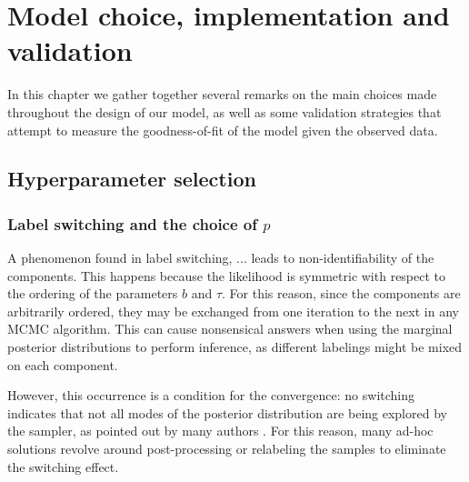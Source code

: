 %
%

\chapter{Model choice, implementation and validation}\label{ch:model-choice}

In this chapter we gather together several remarks on the main choices made throughout the design of our model, as well as some validation strategies that attempt to measure the goodness-of-fit of the model given the observed data.

\section{Hyperparameter selection }

\subsection*{Label switching and the choice of \(p\)}

A phenomenon found in  label switching, ... leads to non-identifiability of the components. This happens because the likelihood is symmetric with respect to the ordering of the parameters \(b\) and \(\tau\). For this reason, since the components are arbitrarily ordered, they may be exchanged from one iteration to the next in any MCMC algorithm. This can cause nonsensical answers when using the marginal posterior distributions to perform inference, as different labelings might be mixed on each component.

However, this occurrence is a condition for the convergence: no switching indicates that not all modes of the posterior distribution are being explored by the sampler, as pointed out by many authors \citep[see for example][]{celeux2000computational}. For this reason, many ad-hoc solutions revolve around post-processing or relabeling the samples to eliminate the switching effect.

